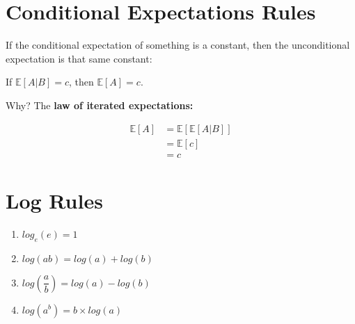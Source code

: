 \documentclass[11pt]{article}
\begin{document}
\section*{Conditional Expectations Rules}

If the conditional expectation of something is a constant, then the unconditional expectation is that same constant:

If $\mathbb{E}[A|B] = c$, then $\mathbb{E}[A] = c$.

Why? The \textbf{law of iterated expectations:}

\begin{align*}
    \mathbb{E}[A] &= \mathbb{E}[\mathbb{E}[A|B]] \\
                  &= \mathbb{E}[c] \\
                  &= c
\end{align*}

\section*{Log Rules}

\begin{enumerate}
    \item $log_{e}(e) = 1$
    \item $log(ab) = log(a) + log(b)$
    \item $log(\dfrac{a}{b}) = log(a) - log(b)$
    \item $log(a^{b}) = b \times log(a)$
\end{enumerate}
\end{document}

